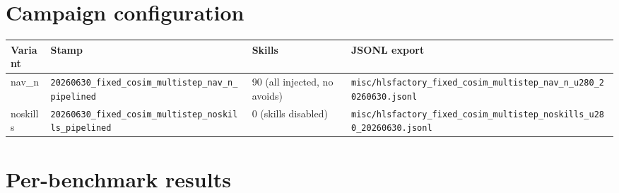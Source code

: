 \documentclass[11pt]{article}
\begin{document}
\section{Campaign configuration}

\begin{table}[h]
\centering
\small
\begin{tabular}{@{}llll@{}}
\toprule
\textbf{Variant} & \textbf{Stamp} & \textbf{Skills} & \textbf{JSONL export} \\
\midrule
nav\_n & \texttt{20260630\_fixed\_cosim\_multistep\_nav\_n\_pipelined} & 90 (all injected, no avoids) & \texttt{misc/hlsfactory\_fixed\_cosim\_multistep\_nav\_n\_u280\_20260630.jsonl} \\
noskills & \texttt{20260630\_fixed\_cosim\_multistep\_noskills\_pipelined} & 0 (skills disabled) & \texttt{misc/hlsfactory\_fixed\_cosim\_multistep\_noskills\_u280\_20260630.jsonl} \\
\bottomrule
\end{tabular}
\end{table}

\section{Per-benchmark results}
\end{document}

